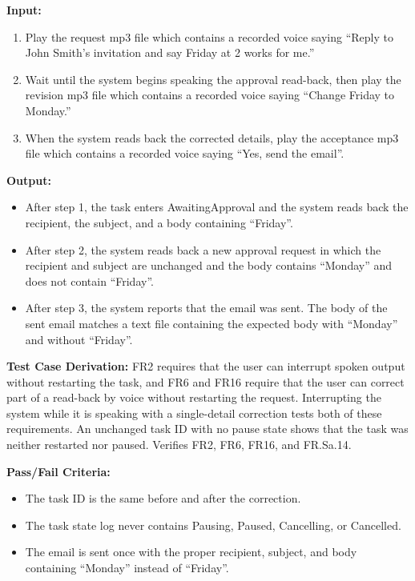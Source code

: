 \documentclass[12pt, titlepage]{article}
\begin{document}
\begin{enumerate}
\textbf{Input:}
\begin{enumerate}
  \item Play the request mp3 file which contains a recorded voice saying ``Reply to John Smith's invitation and say Friday at 2 works for me.''
  \item Wait until the system begins speaking the approval read-back, then
  play the revision mp3 file which contains a recorded voice saying ``Change Friday
  to Monday.''
  \item When the system reads back the corrected details, play the acceptance mp3 file
  which contains a recorded voice saying ``Yes, send the email''.
\end{enumerate}

\textbf{Output:}
\begin{itemize}
  \item After step 1, the task enters AwaitingApproval and the system reads
  back the recipient, the subject, and a body containing ``Friday''.
  \item After step 2, the system reads back a new approval request in which
  the recipient and subject are unchanged and the body contains ``Monday''
  and does not contain ``Friday''. 
  \item After step 3, the system reports that the email was sent. The body of the sent email
  matches a text file containing the expected body with ``Monday'' and without ``Friday''.
\end{itemize}

\textbf{Test Case Derivation:} FR2 requires that the user can interrupt spoken
output without restarting the task, and FR6 and FR16 require that the user can correct part of a
read-back by voice without restarting the request. Interrupting the system while it is speaking with a
single-detail correction tests both of these requirements. An unchanged task ID with no 
pause state shows that the task was neither restarted nor paused. Verifies FR2, FR6, FR16, and FR.Sa.14.

\textbf{Pass/Fail Criteria:}
\begin{itemize}
  \item The task ID is the same before and after the correction.
  \item The task state log never contains Pausing, Paused, Cancelling, or Cancelled.
  \item The email is sent once with the proper recipient, subject, and body containing ``Monday'' instead of ``Friday''.
\end{itemize}


\end{enumerate}
\end{document}
